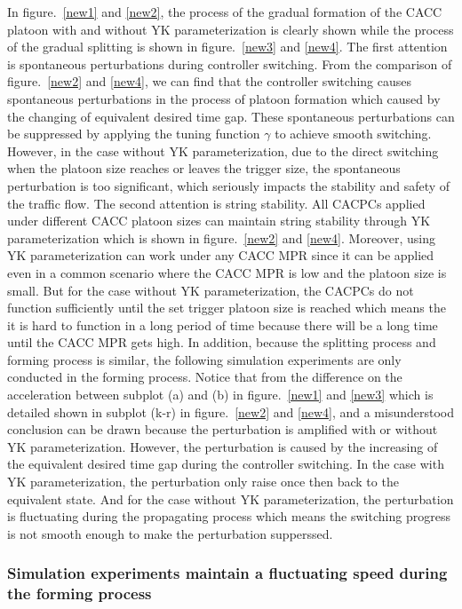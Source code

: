 \documentclass[journal]{IEEEtran}
\begin{document}
In figure.~\ref{new1} and \ref{new2}, the process of the gradual formation of the CACC platoon with and without YK parameterization is clearly shown while the process of the gradual splitting is shown in figure.~\ref{new3} and \ref{new4}. The first attention is spontaneous perturbations during controller switching. From the comparison of figure.~\ref{new2} and \ref{new4}, we can find that the controller switching causes spontaneous perturbations in the process of platoon formation which caused by the changing of equivalent desired time gap. These spontaneous perturbations can be suppressed by applying the tuning function $\gamma$ to achieve smooth switching. However, in the case without YK parameterization, due to the direct switching when the platoon size reaches or leaves the trigger size, the spontaneous perturbation is too significant, which seriously impacts the stability and safety of the traffic flow. The second attention is string stability. All CACPCs applied under different CACC platoon sizes can maintain string stability through YK parameterization which is shown in figure.~\ref{new2} and \ref{new4}. Moreover, using YK parameterization can work under any CACC MPR since it can be applied even in a common scenario where the CACC MPR is low and the platoon size is small. But for the case without YK parameterization, the CACPCs do not function sufficiently until the set trigger platoon size is reached  which means the it is hard to function in a long period of time because there will be a long time until the CACC MPR gets high. In addition, because the splitting process and forming process is similar, the following simulation experiments are only conducted in the forming process. Notice that from the difference on the acceleration between subplot (a) and (b) in figure.~\ref{new1} and \ref{new3} which is detailed shown in subplot (k-r) in figure.~\ref{new2} and \ref{new4}, and a misunderstood conclusion can be drawn because the perturbation is amplified with or without YK parameterization. However, the perturbation is caused by the increasing of the equivalent desired time gap during the controller switching. In the case with YK parameterization, the perturbation only raise once then back to the equivalent state. And for the case without YK parameterization, the perturbation is fluctuating during the propagating process which means the switching progress is not smooth enough to make the perturbation supperssed.

\subsubsection{Simulation experiments maintain a fluctuating speed during the forming process}
\label{Section 5.2.2}
\end{document}
